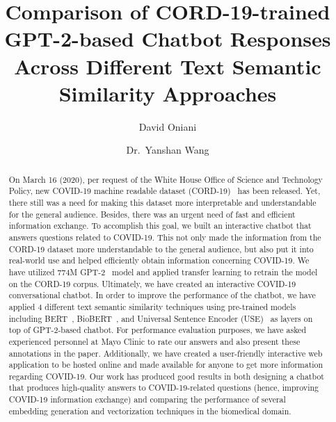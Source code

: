 \documentclass[sigconf,natbib=false]{acmart}
\title{Comparison of CORD-19-trained GPT-2-based Chatbot Responses Across
  Different Text Semantic Similarity Approaches}
\author{David Oniani}
\affiliation{%
  \institution{Mayo Clinic}
  \department{Kern Center for the Science of Health Care Delivery}
  \city{Rochester}
  \state{MN}
  \country{USA}}
\author{Dr.~Yanshan Wang}
\affiliation{%
  \institution{Mayo Clinic}
  \department{Division of Digital Health Sciences}
  \city{Rochester}
  \state{MN}
  \country{USA}}
\begin{document}

\begin{abstract}
On March 16 (2020), per request of the White House Office of Science and
Technology Policy, new COVID-19 machine readable dataset
(CORD-19)~\cite{whitehousecovid2020} has been released. Yet, there still was a
need for making this dataset more interpretable and understandable for the
general audience. Besides, there was an urgent need of fast and efficient
information exchange. To accomplish this goal, we built an interactive chatbot
that answers questions related to COVID-19. This not only made the information
from the CORD-19 dataset more understandable to the general audience, but also
put it into real-world use and helped efficiently obtain information concerning
COVID-19. We have utilized 774M GPT-2~\cite{radford2019language} model and
applied transfer learning to retrain the model on the CORD-19 corpus.
Ultimately, we have created an interactive COVID-19 conversational chatbot. In
order to improve the performance of the chatbot, we have applied 4 different
text semantic similarity techniques using pre-trained models including
BERT~\cite{turc2019}, BioBERT~\cite{btz682}, and Universal Sentence Encoder
(USE)~\cite{use} as layers on top of GPT-2-based chatbot. For performance
evaluation purposes, we have asked experienced personnel at Mayo Clinic to rate
our answers and also present these annotations in the paper. Additionally, we
have created a user-friendly interactive web application to be hosted online
and made available for anyone to get more information regarding COVID-19. Our
work has produced good results in both designing a chatbot that produces
high-quality answers to COVID-19-related questions (hence, improving COVID-19
information exchange) and comparing the performance of several embedding
generation and vectorization techniques in the biomedical domain.

\end{abstract}


\maketitle

\end{document}
